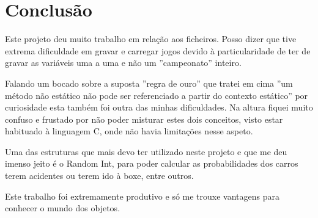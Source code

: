 \documentclass[10pt]{article}
\begin{document}
 
\section{Conclusão}
Este projeto deu muito trabalho em relação aos ficheiros. Posso dizer que tive extrema dificuldade em gravar e carregar jogos devido à particularidade de ter de gravar as variáveis uma a uma e não um ''campeonato''  inteiro.

Falando um bocado sobre a suposta ''regra de ouro'' que tratei em cima ''um método não estático não pode ser referenciado a partir do contexto estático'' por curiosidade esta também foi outra das minhas dificuldades. Na altura fiquei muito confuso e frustado por não poder misturar estes dois conceitos, visto estar habituado à linguagem C, onde não havia limitações nesse aspeto.

Uma das estruturas que mais devo ter utilizado neste projeto e que me deu imenso jeito é o Random Int, para poder calcular as probabilidades dos carros terem acidentes ou terem ido à boxe, entre outros.

Este trabalho foi extremamente produtivo e só me trouxe vantagens para conhecer o mundo dos objetos.
\end{document}

